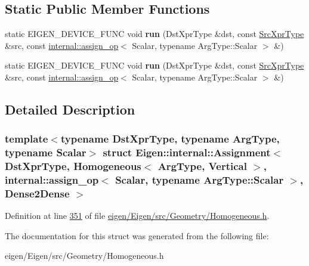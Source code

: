 \subsection*{Static Public Member Functions}
\begin{DoxyCompactItemize}
\item 
\mbox{\label{struct_eigen_1_1internal_1_1_assignment_3_01_dst_xpr_type_00_01_homogeneous_3_01_arg_type_00_01_0510af0d603205dcee3ee308c9bc1bc6_a770eda3cab096546dd27ba4d5399241d}} 
static E\+I\+G\+E\+N\+\_\+\+D\+E\+V\+I\+C\+E\+\_\+\+F\+U\+NC void {\bfseries run} (Dst\+Xpr\+Type \&dst, const \hyperlink{group___geometry___module_class_eigen_1_1_homogeneous}{Src\+Xpr\+Type} \&src, const \hyperlink{struct_eigen_1_1internal_1_1assign__op}{internal\+::assign\+\_\+op}$<$ Scalar, typename Arg\+Type\+::\+Scalar $>$ \&)
\item 
\mbox{\label{struct_eigen_1_1internal_1_1_assignment_3_01_dst_xpr_type_00_01_homogeneous_3_01_arg_type_00_01_0510af0d603205dcee3ee308c9bc1bc6_a770eda3cab096546dd27ba4d5399241d}} 
static E\+I\+G\+E\+N\+\_\+\+D\+E\+V\+I\+C\+E\+\_\+\+F\+U\+NC void {\bfseries run} (Dst\+Xpr\+Type \&dst, const \hyperlink{group___geometry___module_class_eigen_1_1_homogeneous}{Src\+Xpr\+Type} \&src, const \hyperlink{struct_eigen_1_1internal_1_1assign__op}{internal\+::assign\+\_\+op}$<$ Scalar, typename Arg\+Type\+::\+Scalar $>$ \&)
\end{DoxyCompactItemize}


\subsection{Detailed Description}
\subsubsection*{template$<$typename Dst\+Xpr\+Type, typename Arg\+Type, typename Scalar$>$\newline
struct Eigen\+::internal\+::\+Assignment$<$ Dst\+Xpr\+Type, Homogeneous$<$ Arg\+Type, Vertical $>$, internal\+::assign\+\_\+op$<$ Scalar, typename Arg\+Type\+::\+Scalar $>$, Dense2\+Dense $>$}



Definition at line \hyperlink{eigen_2_eigen_2src_2_geometry_2_homogeneous_8h_source_l00351}{351} of file \hyperlink{eigen_2_eigen_2src_2_geometry_2_homogeneous_8h_source}{eigen/\+Eigen/src/\+Geometry/\+Homogeneous.\+h}.



The documentation for this struct was generated from the following file\+:\begin{DoxyCompactItemize}
\item 
eigen/\+Eigen/src/\+Geometry/\+Homogeneous.\+h\end{DoxyCompactItemize}
